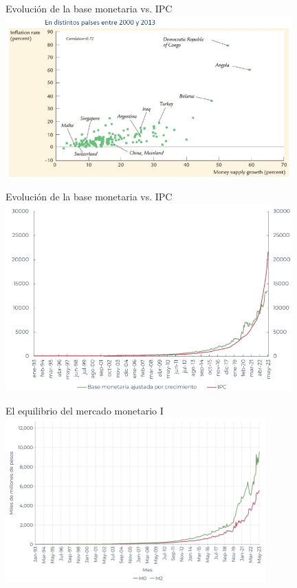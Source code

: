 \documentclass{beamer}
\begin{document}
\begin{frame}{Evolución de la base monetaria vs. IPC}
\centering\includegraphics[width=11cm]{../Figures/C33.4.jpg}\
\end{frame}

\begin{frame}{Evolución de la base monetaria vs. IPC}
    \centering
    \includegraphics[width=11cm]{../Figures/C38.7.png}\
\end{frame}


\begin{frame}{El equilibrio del mercado monetario I}
\centering\includegraphics[width=10cm]{../Figures/C38.8.png}\
\end{frame}
\end{document}
